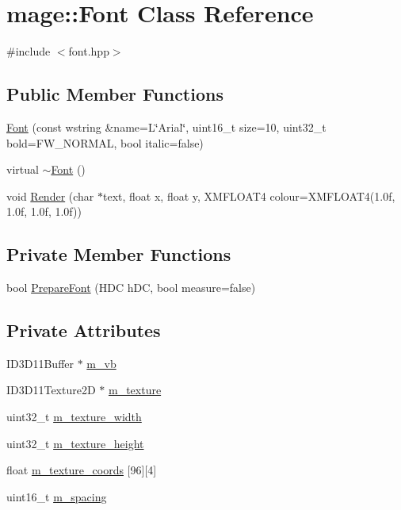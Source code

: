 \hypertarget{classmage_1_1_font}{}\section{mage\+:\+:Font Class Reference}
\label{classmage_1_1_font}


{\ttfamily \#include $<$font.\+hpp$>$}

\subsection*{Public Member Functions}
\begin{DoxyCompactItemize}
\item 
\hyperlink{classmage_1_1_font_a10cc7123d8afdea0d092467b44dc7b66}{Font} (const wstring \&name=L\char`\"{}Arial\char`\"{}, uint16\+\_\+t size=10, uint32\+\_\+t bold=F\+W\+\_\+\+N\+O\+R\+M\+AL, bool italic=false)
\item 
virtual \hyperlink{classmage_1_1_font_a4d984764d0393dc835d98888f98dd02d}{$\sim$\+Font} ()
\item 
void \hyperlink{classmage_1_1_font_a1be5ae8a4da06d84081fde478df7fd0e}{Render} (char $\ast$text, float x, float y, X\+M\+F\+L\+O\+A\+T4 colour=X\+M\+F\+L\+O\+A\+T4(1.\+0f, 1.\+0f, 1.\+0f, 1.\+0f))
\end{DoxyCompactItemize}
\subsection*{Private Member Functions}
\begin{DoxyCompactItemize}
\item 
bool \hyperlink{classmage_1_1_font_a4cbf910a292f2957b43fd4060db6aba4}{Prepare\+Font} (H\+DC h\+DC, bool measure=false)
\end{DoxyCompactItemize}
\subsection*{Private Attributes}
\begin{DoxyCompactItemize}
\item 
I\+D3\+D11\+Buffer $\ast$ \hyperlink{classmage_1_1_font_ada16cf68ca1fe4b3f1b4b2287711bb09}{m\+\_\+vb}
\item 
I\+D3\+D11\+Texture2D $\ast$ \hyperlink{classmage_1_1_font_a4ccec8d9d3e29b3ef307b8111084c9b8}{m\+\_\+texture}
\item 
uint32\+\_\+t \hyperlink{classmage_1_1_font_ab74c50dc44037c95c7a568c9695d520b}{m\+\_\+texture\+\_\+width}
\item 
uint32\+\_\+t \hyperlink{classmage_1_1_font_afcc7dba6d0991eca65a32d55b6cba503}{m\+\_\+texture\+\_\+height}
\item 
float \hyperlink{classmage_1_1_font_a6b03de184fbf6fa4e663d711e86656f0}{m\+\_\+texture\+\_\+coords} \mbox{[}96\mbox{]}\mbox{[}4\mbox{]}
\item 
uint16\+\_\+t \hyperlink{classmage_1_1_font_adf5b07b3d91d4dc84e92c3e997ec3d13}{m\+\_\+spacing}
\end{DoxyCompactItemize}


